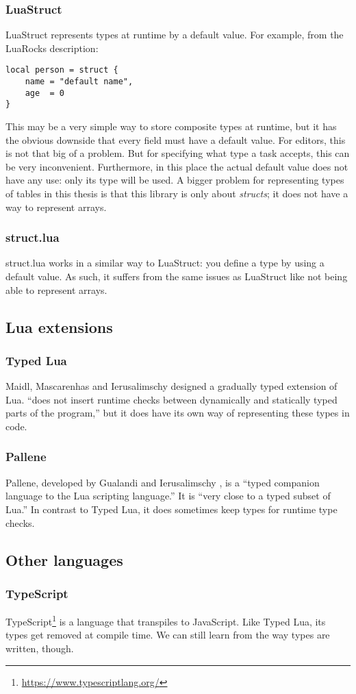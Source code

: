 \subsubsection{LuaStruct}
LuaStruct represents types at runtime by a default value. For example, from the LuaRocks description:

\medskip
\begin{verbatim}
local person = struct {
    name = "default name",
    age  = 0
}
\end{verbatim}

This may be a very simple way to store composite types at runtime, but it has the obvious downside that every field must have a default value. For editors, this is not that big of a problem. But for specifying what type a task accepts, this can be very inconvenient. Furthermore, in this place the actual default value does not have any use: only its type will be used. A bigger problem for representing types of tables in this thesis is that this library is only about \textit{structs}; it does not have a way to represent arrays.

\subsubsection{struct.lua}
struct.lua works in a similar way to LuaStruct: you define a type by using a default value. As such, it suffers from the same issues as LuaStruct like not being able to represent arrays.

\subsection{Lua extensions}
\subsubsection{Typed Lua}
Maidl, Mascarenhas and Ierusalimschy \cite{maidl2014typed} designed a gradually typed extension of Lua. ``does not insert runtime checks between dynamically and statically typed parts of the program,'' but it does have its own way of representing these types in code.

\subsubsection{Pallene}
Pallene, developed by Gualandi and Ierusalimschy \cite{gualandi2020pallene}, is a ``typed companion language to the Lua scripting language.'' It is ``very close to a typed subset of Lua.'' In contrast to Typed Lua, it does sometimes keep types for runtime type checks.

\subsection{Other languages}
\subsubsection{TypeScript}
TypeScript\footnote{\url{https://www.typescriptlang.org/}} is a language that transpiles to JavaScript. Like Typed Lua, its types get removed at compile time. We can still learn from the way types are written, though.
